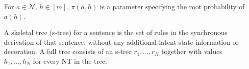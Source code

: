\documentclass[11pt]{article}
\newcommand{\rules}{{\cal R}}
\newcommand{\bS}{{\bf S}}
\newcommand{\bX}{{\bf X}}
\newenvironment{itemizesquish}{\begin{list}{\setcounter{enumi}{0}\labelitemi}{\setlength{\itemsep}{-0.25em}\setlength{\labelwidth}{0.5em}\setlength{\leftmargin}{\labelwidth}\addtolength{\leftmargin}{\labelsep}}}{\end{list}}
\newcommand{\cjd}[1]{\textcolor{red}{\textbf{[#1 --CJD] }}}
\newcommand{\avcomment}[1]{\textcolor{orange}{\textbf{[#1 -- Av]}}}
\newcommand{\ignore}[1]{}
\begin{document}
\begin{itemizesquish}
\ignore{
For $a =\bX, b \in [n_s] \cup \mathcal{N} \setminus \{\bS\}, c \in [n_t]
     \cup \mathcal{N} \setminus \{\bS\}, h_1, h_2, h_3 \in [m]$, we have the following context-free rules, based on the number of NT symbols \bX~in the RHS of the rule:
     \begin{itemize}
       \item Two NTs: \\
	   $a(h_1) \rightarrow ~ \langle b(h_2, h_3), c(h_2, h_3), \sim \rangle$, where $\sim$ is a one-to-one correspondence between the NT symbols of $b$ and $c$, $h_2$ is associated with one of the aligned NT pairs, and $h_3$ is associated with the other pair.  
	   The rule has an associated parameter $t(a \rightarrow b,c, h_2, h_3 | a, h_1)$
       \item One NT: \\
	   	$a(h_1) \rightarrow ~\langle b(h_2), c(h_2), \sim \rangle$, with associated parameter $t(a \rightarrow b, c, h_2 | a, h_1)$
       \item No NTs:
	   	$a(h_1) \rightarrow ~ \langle b, c,\sim \rangle$, with associated parameter $t(a \rightarrow b,c | a, h_1)$
        \end{itemize}
}
         \item For $a \in \mathcal{N}$, $h \in [m]$, $\pi(a, h)$ is a parameter specifying the root probability of $a(h)$. 
\end{itemizesquish}
A skeletal tree (s-tree) for a sentence is the set of rules in the synchronous derivation of that sentence, without any additional latent state information or decoration.  
A full tree consists of an s-tree $r_1, \dots, r_N$ together with values $h_1, \dots, h_N$ for every NT in the tree.  
\end{document}

